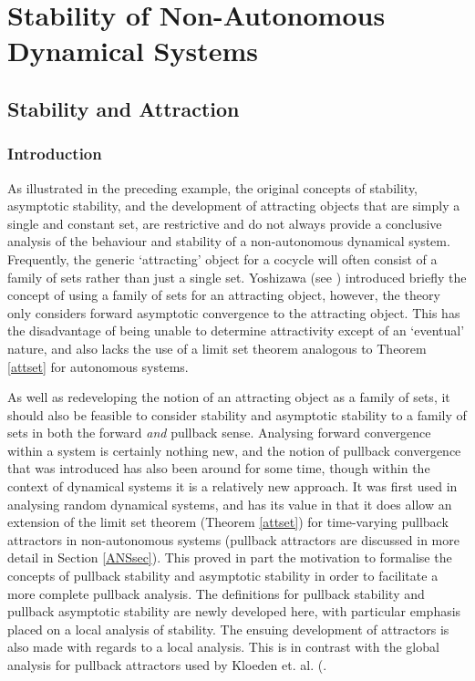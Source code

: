 
\chapter[Non-Autonomous Dynamical Systems]{Stability of Non-Autonomous Dynamical Systems}
\label{cocyclechapter}

\section{Stability and Attraction}\label{stabatt}
\subsection{Introduction}

As illustrated in the preceding example, the original concepts of
stability, asymptotic stability, and the development of attracting
objects that are simply a single and constant set, are restrictive
and do not always provide a conclusive analysis of the behaviour
and stability of a non-autonomous dynamical system. Frequently,
the generic `attracting' object for a cocycle will often consist
of a family of sets rather than just a single set. Yoshizawa (see
\cite{Yo66}) introduced briefly the concept of using a family of
sets for an attracting object, however, the theory only considers
forward asymptotic convergence to the attracting object. This has
the disadvantage of being unable to determine attractivity except
of an `eventual' nature, and also lacks the use of a limit set
theorem analogous to Theorem \ref{attset} for autonomous systems.


As well as redeveloping the notion of an attracting object as a family of
sets, it should also be feasible to consider stability and asymptotic
stability to a family of sets in both the forward \textit{and} pullback sense.
Analysing forward convergence within a system is certainly nothing new,
and the notion of pullback convergence that was introduced has also been
around for some time, though within the context of dynamical systems it is
a relatively new approach. It was first used in analysing random dynamical
systems, and has its value in that it does allow an extension of the limit set
theorem (Theorem \ref{attset}) for time-varying pullback attractors in non-autonomous
systems (pullback attractors are discussed in more detail in Section
\ref{ANSsec}). This proved in part the motivation to formalise the concepts
of pullback stability and asymptotic stability in order to facilitate a
more complete pullback analysis. The definitions for pullback stability and
pullback asymptotic stability are newly developed here, with particular emphasis
placed on a local analysis of stability. The ensuing development of attractors
is also made with regards to a local analysis. This is in contrast with the
global analysis for pullback attractors used by Kloeden et. al.
(\cite{KlSc95,KlSc96}.

